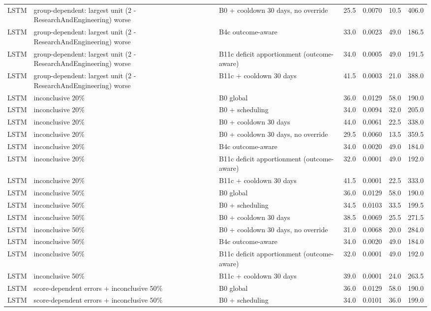 \begin{longtable}{lp{5.2cm}p{4.4cm}cccc}
LSTM & group-dependent: largest unit (2 - ResearchAndEngineering) worse & B0 + cooldown 30 days, no override & 25.5 & 0.0070 & 10.5 & 406.0 \\
LSTM & group-dependent: largest unit (2 - ResearchAndEngineering) worse & B4c outcome-aware & 33.0 & 0.0023 & 49.0 & 186.5 \\
LSTM & group-dependent: largest unit (2 - ResearchAndEngineering) worse & B11c deficit apportionment (outcome-aware) & 34.0 & 0.0005 & 49.0 & 191.5 \\
LSTM & group-dependent: largest unit (2 - ResearchAndEngineering) worse & B11c + cooldown 30 days & 41.5 & 0.0003 & 21.0 & 388.0 \\
LSTM & inconclusive 20\% & B0 global & 36.0 & 0.0129 & 58.0 & 190.0 \\
LSTM & inconclusive 20\% & B0 + scheduling & 34.0 & 0.0094 & 32.0 & 205.0 \\
LSTM & inconclusive 20\% & B0 + cooldown 30 days & 44.0 & 0.0061 & 22.5 & 338.0 \\
LSTM & inconclusive 20\% & B0 + cooldown 30 days, no override & 29.5 & 0.0060 & 13.5 & 359.5 \\
LSTM & inconclusive 20\% & B4c outcome-aware & 34.0 & 0.0020 & 49.0 & 184.0 \\
LSTM & inconclusive 20\% & B11c deficit apportionment (outcome-aware) & 32.0 & 0.0001 & 49.0 & 192.0 \\
LSTM & inconclusive 20\% & B11c + cooldown 30 days & 41.5 & 0.0001 & 22.5 & 333.0 \\
LSTM & inconclusive 50\% & B0 global & 36.0 & 0.0129 & 58.0 & 190.0 \\
LSTM & inconclusive 50\% & B0 + scheduling & 34.5 & 0.0103 & 33.5 & 199.5 \\
LSTM & inconclusive 50\% & B0 + cooldown 30 days & 38.5 & 0.0069 & 25.5 & 271.5 \\
LSTM & inconclusive 50\% & B0 + cooldown 30 days, no override & 31.0 & 0.0068 & 20.0 & 284.0 \\
LSTM & inconclusive 50\% & B4c outcome-aware & 34.0 & 0.0020 & 49.0 & 184.0 \\
LSTM & inconclusive 50\% & B11c deficit apportionment (outcome-aware) & 32.0 & 0.0001 & 49.0 & 192.0 \\
LSTM & inconclusive 50\% & B11c + cooldown 30 days & 39.0 & 0.0001 & 24.0 & 263.5 \\
LSTM & score-dependent errors + inconclusive 50\% & B0 global & 36.0 & 0.0129 & 58.0 & 190.0 \\
LSTM & score-dependent errors + inconclusive 50\% & B0 + scheduling & 34.0 & 0.0101 & 36.0 & 199.0 \\

\end{longtable}
